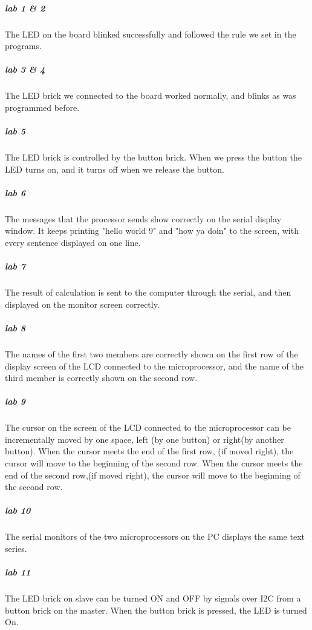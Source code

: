 \subparagraph{lab 1 \& 2}
The LED on the board blinked successfully and followed the rule we set in the programs.
\subparagraph{lab 3 \& 4}
The LED brick we connected to the board worked normally, and blinks as was programmed before.
\subparagraph{lab 5}
The LED brick is controlled by the button brick. When we press the button the LED turns on, and it turns off when we release the button.
\subparagraph{lab 6}
The messages that the processor sends show correctly on the serial display window. It keeps printing "hello world 9" and "how ya doin" to the screen, with every sentence displayed on one line.
\subparagraph{lab 7}
The result of calculation is sent to the computer through the serial, and then displayed on the monitor screen correctly.
\subparagraph{lab 8}
The names of the first two members are correctly shown on the first row of the display screen of the LCD connected to the microprocessor, and the name of the third member is correctly shown on the second row.
\subparagraph{lab 9}
The cursor on the screen of the LCD connected to the microprocessor can be incrementally moved by one space, left (by one button) or right(by another button). When the cursor meets the end of the first row, (if moved right), the cursor will move to the beginning of the second row. When the cursor meets the end of the second row,(if moved right), the cursor will move to the beginning of the second row.
\subparagraph{lab 10}
The serial monitors of the two microprocessors on the PC displays the same text series.
\subparagraph{lab 11}
The LED brick on slave can be turned ON and OFF by signals over I2C from a button brick on the master. When the button brick is pressed, the LED is turned On.
